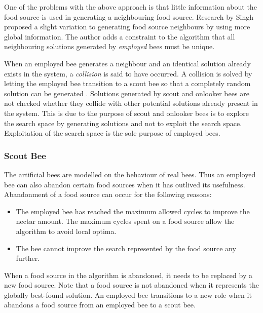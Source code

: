 One of the problems with the above approach is that little information about the food source is used in generating a neighbouring food source. Research by Singh \cite{ABCLeafConstrained} proposed a slight variation to generating food source neighbours by using more global information. The author adds a constraint to the algorithm that all neighbouring solutions generated by \emph{employed} bees must be unique. 

When an employed bee generates a neighbour and an identical solution already exists in the system, a \emph{collision} is said to have occurred. A collision is solved by letting the employed bee transition to a scout bee so that a completely random solution can be generated \cite{ABCLeafConstrained}. Solutions generated by scout and onlooker bees are not checked whether they collide with other potential solutions already present in the system\cite{BeeJobShop,ABCCompareStudy}. This is due to the purpose of scout and onlooker bees is to explore the search space by generating solutions and not to exploit the search space\cite{BeeJobShop,ABCCompareStudy}. Exploitation of the search space is the sole purpose of employed bees\cite{BeeJobShop,ABCCompareStudy}. 
\subsubsection{Scout Bee}
The artificial bees are modelled on the behaviour of real bees. Thus an employed bee can also abandon certain food sources when it has outlived its usefulness. Abandonment of a food source can occur for the following reasons\cite{BeeJobShop,ABCNumericalOptimization,ABCImageEnhancement}:
\begin{itemize}
\item The employed bee has reached the maximum allowed cycles to improve the nectar amount. The maximum cycles spent on a food source allow the algorithm to avoid local optima\cite{ABCCompareStudy,ABCNumericalOptimization,ABCImageEnhancement}.
\item The bee cannot improve the search represented by the food source any further\cite{ABCCompareStudy,ABCNumericalOptimization,ABCImageEnhancement}.
\end{itemize}
When a food source in the algorithm is abandoned, it needs to be replaced by a new food source\cite{BeeJobShop,ABCCompareStudy,ABCImageEnhancement}. Note that a food source is not abandoned when it represents the globally best-found solution. An employed bee transitions to a new role when it abandons a food source from an employed bee to a scout bee\cite{ABCCompareStudy,ABCNumericalOptimization,ABCImageEnhancement}. 

